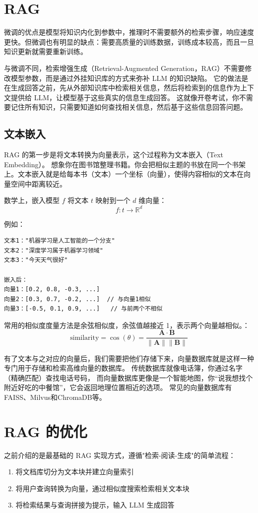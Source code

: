 \section{RAG}
微调的优点是模型将知识内化到参数中，推理时不需要额外的检索步骤，响应速度更快。但微调也有明显的缺点：需要高质量的训练数据，训练成本较高，而且一旦知识更新就需要重新训练。

与微调不同，检索增强生成（Retrieval-Augmented Generation，RAG）不需要修改模型参数，而是通过外挂知识库的方式来弥补 LLM 的知识缺陷。
它的做法是在生成回答之前，先从外部知识库中检索相关信息，然后将检索到的信息作为上下文提供给 LLM，让模型基于这些真实的信息生成回答。
这就像开卷考试，你不需要记住所有知识，只需要知道如何查找相关信息，然后基于这些信息回答问题。

\subsection{文本嵌入}
RAG 的第一步是将文本转换为向量表示，这个过程称为文本嵌入（Text Embedding）。
想象你在图书馆整理书籍。你会把相似主题的书放在同一个书架上。文本嵌入就是给每本书（文本）一个坐标（向量），使得内容相似的文本在向量空间中距离较近。

数学上，嵌入模型 $f$ 将文本 $t$ 映射到一个 $d$ 维向量：
\begin{equation*}
	f: t \rightarrow \mathbb{R}^d
\end{equation*}

例如：
\begin{verbatim}
文本1："机器学习是人工智能的一个分支"
文本2："深度学习属于机器学习领域"
文本3："今天天气很好"

嵌入后：
向量1：[0.2, 0.8, -0.3, ...]
向量2：[0.3, 0.7, -0.2, ...]  // 与向量1相似
向量3：[-0.5, 0.1, 0.9, ...]   // 与前两个不相似
\end{verbatim}

常用的相似度度量方法是余弦相似度，余弦值越接近 1，表示两个向量越相似。：
\begin{equation*}
	\text{similarity} = \cos(\theta) = \frac{\mathbf{A} \cdot \mathbf{B}}{\|\mathbf{A}\| \|\mathbf{B}\|}
\end{equation*}

有了文本与之对应的向量后，我们需要把他们存储下来，向量数据库就是这样一种专门用于存储和检索高维向量的数据库。
传统数据库就像电话簿，你通过名字（精确匹配）查找电话号码，
而向量数据库更像是一个智能地图，你“说我想找个附近好吃的中餐馆”，它会返回地理位置相近的选项。
常见的向量数据库有FAISS、Milvus和ChromaDB等。

\section{RAG 的优化}
之前介绍的是最基础的 RAG 实现方式，遵循"检索-阅读-生成"的简单流程：
\begin{enumerate}
	\item 将文档库切分为文本块并建立向量索引
	\item 将用户查询转换为向量，通过相似度搜索检索相关文本块
	\item 将检索结果与查询拼接为提示，输入 LLM 生成回答
\end{enumerate}

